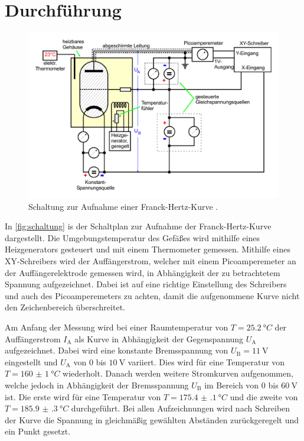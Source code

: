 \section{Durchführung}
\label{sec:Durchführung}

\begin{figure}[H]
    \centering
    \includegraphics[width=0.8\linewidth]{pictures/schaltplan.pdf}
    \caption{Schaltung zur Aufnahme einer Franck-Hertz-Kurve \cite{v601}.}
    \label{fig:schaltung}
\end{figure}

In \autoref{fig:schaltung} is der Schaltplan zur Aufnahme der Franck-Hertz-Kurve dargestellt.
Die Umgebungstemperatur des Gefäßes wird mithilfe eines Heizgenerators gesteuert und mit einem Thermometer gemessen.
Mithilfe eines XY-Schreibers wird der Auffängerstrom, welcher mit einem Picoamperemeter an der Auffängerelektrode gemessen wird,
in Abhängigkeit der zu betrachtetem Spannung aufgezeichnet.
Dabei ist auf eine richtige Einstellung des Schreibers und auch des Picoamperemeters zu achten, damit die aufgenommene Kurve nicht den Zeichenbereich überschreitet.

Am Anfang der Messung wird bei einer Raumtemperatur von $T = \qty{25,2}{°C}$ der Auffängerstrom $I_\text{A}$ als Kurve in Abhängigkeit der Gegenspannung $U_\text{A}$ aufgezeichnet.
Dabei wird eine konstante Bremsspannung von $U_\text{B} = \qty{11}{\volt}$ eingestellt und $U_\text{A}$ von 0 bis $\qty{10}{\volt}$ variiert.
Dies wird für eine Temperatur von $T = \qty{160(1)}{°C}$ wiederholt. 
Danach werden weitere Stromkurven aufgenommen, welche jedoch in Abhängigkeit der Bremsspannung $U_\text{B}$ im Bereich von 0 bis $\qty{60}{\volt}$ ist.
Die erste wird für eine Temperatur von $T = \qty{175.4(1)}{°C}$ und die zweite von $T = \qty{185.9(3)}{°C}$ durchgeführt.
Bei allen Aufzeichnungen wird nach Schreiben der Kurve die Spannung in gleichmäßig gewählten Abständen zurückgeregelt und ein Punkt gesetzt.
